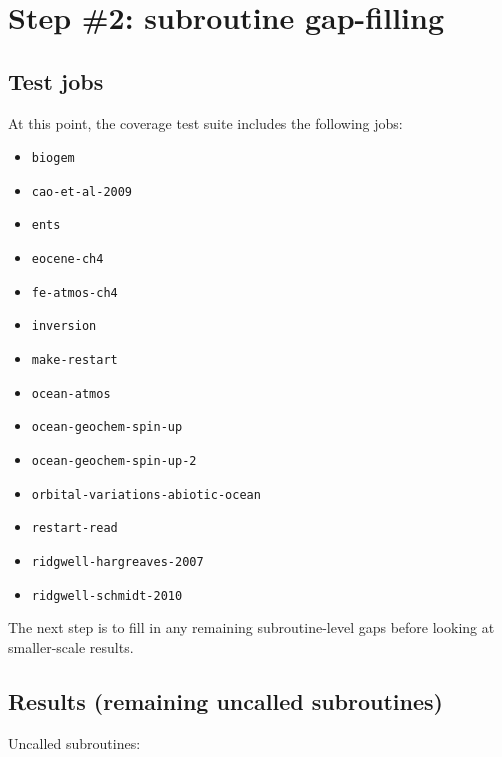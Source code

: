 \documentclass[a4paper,10pt,article]{memoir}
\begin{document}
\chapter{Step \#2: subroutine gap-filling}

\section{Test jobs}

At this point, the coverage test suite includes the following jobs:
\begin{itemize}
  \setlength\itemsep{0pt}
  \item{\texttt{biogem}}
  \item{\texttt{cao-et-al-2009}}
  \item{\texttt{ents}}
  \item{\texttt{eocene-ch4}}
  \item{\texttt{fe-atmos-ch4}}
  \item{\texttt{inversion}}
  \item{\texttt{make-restart}}
  \item{\texttt{ocean-atmos}}
  \item{\texttt{ocean-geochem-spin-up}}
  \item{\texttt{ocean-geochem-spin-up-2}}
  \item{\texttt{orbital-variations-abiotic-ocean}}
  \item{\texttt{restart-read}}
  \item{\texttt{ridgwell-hargreaves-2007}}
  \item{\texttt{ridgwell-schmidt-2010}}
\end{itemize}

The next step is to fill in any remaining subroutine-level gaps before
looking at smaller-scale results.

\section{Results (remaining uncalled subroutines)}

Uncalled subroutines:
\end{document}
